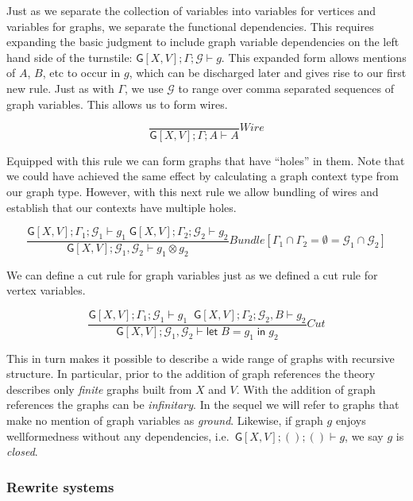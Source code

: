 \documentclass[12pt]{llncs}
\begin{document}
Just as we separate the collection of variables into variables for
vertices and variables for graphs, we separate the functional
dependencies. This requires expanding the basic judgment to include
graph variable dependencies on the left hand side of the turnstile:
\(\mathsf{G}[X,V]; \Gamma; \mathcal{G} \vdash g\). This expanded form
allows mentions of \(A\), \(B\), etc to occur in \(g\), which can be
discharged later and gives rise to our first new rule. Just as with
\(\Gamma\), we use \(\mathcal{G}\) to range over comma separated
sequences of graph variables. This allows us to form wires.

\[\frac{ }{ \mathsf{G}[X,V]; \Gamma; A \vdash A}Wire\]

Equipped with this rule we can form graphs that have ``holes'' in them.
Note that we could have achieved the same effect by calculating a graph
context type from our graph type. However, with this next rule we allow
bundling of wires and establish that our contexts have multiple holes.

\[\frac{ \mathsf{G}[X,V]; \Gamma_1; \mathcal{G}_1 \vdash g_1\; \mathsf{G}[X,V]; \Gamma_2; \mathcal{G}_2 \vdash g_2 }{ \mathsf{G}[X,V]; \mathcal{G}_1, \mathcal{G}_2 \vdash g_1 \otimes g_2 }Bundle [\Gamma_1 \cap \Gamma_2 = \emptyset = \mathcal{G}_1\cap\mathcal{G}_2 ]\]

We can define a cut rule for graph variables just as we defined a cut
rule for vertex variables.

\[\frac{ \mathsf{G}[X,V]; \Gamma_1; \mathcal{G}_1 \vdash g_1 \; \;\mathsf{G}[X,V]; \Gamma_2; \mathcal{G}_2, B \vdash g_2}{ \mathsf{G}[X,V]; \mathcal{G}_{1}, \mathcal{G}_{2} \vdash \mathsf{let}\; B = g_1 \; \mathsf{in}\; g_2}Cut\]

This in turn makes it possible to describe a wide range of graphs with
recursive structure. In particular, prior to the addition of graph
references the theory describes only \emph{finite} graphs built from
\(X\) and \(V\). With the addition of graph references the graphs can be
\emph{infinitary}. In the sequel we will refer to graphs that make no
mention of graph variables as \emph{ground}. Likewise, if graph \(g\)
enjoys wellformedness without any dependencies,
i.e.~\(\mathsf{G}[X,V]; (); () \vdash g\), we say \(g\) is
\emph{closed}.

\hypertarget{rewrite-systems}{%
\subsubsection{Rewrite systems}\label{rewrite-systems}}
\end{document}
